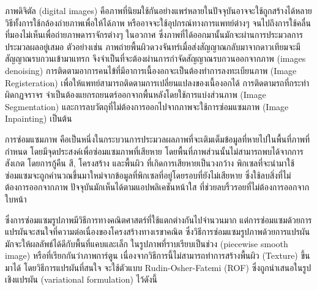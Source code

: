 \documentclass[hidelinks,a4paper,14pt]{article}
\numberwithin{equation}{section}							%
\begin{document}
{%
	
	
	
	
	
	ภาพดิจิตัล (digital images)  คือภาพที่นิยมใช้กันอย่างแพร่หลายในปัจจุบันอาจจะใช้ถูกสร้างได้หลายวิธีทั้งการใช้กล้องถ่ายภาพเพื่อให้ได้ภาพ หรืออาจจะใช้อุปกรณ์ทางการแพทย์ต่างๆ จนไปถึงการใช้คลื่นที่มองไม่เห็นเพื่อถ่ายภาพดาราจักรต่างๆ ในอวกาศ  ซึ่งภาพที่ได้ออกมานั้นมักจะผ่านการประมวลการประมวลผลอยู่เสมอ ตัวอย่างเช่น ภาพถ่ายพื้นผิวดวงจันทร์เมื่อส่งสัญญาณกลับมาจากดาวเทียมจะมีสัญญาณรบกวนเข้ามาแทรก จึงจำเป็นที่จะต้องผ่านการกำจัดสัญญาณรบกวนออกจากภาพ (images denoising) การติดตามอาการคนไข้ที่มีอาการเนื้องอกจะเป็นต้องทำการลงทะเบียนภาพ (Image Registeration) เพื่อให้แพทย์สามารถติดตามการเปลี่ยนแปลงของเนื้องอกได้ การติดตามรถที่กระทำผิดกฏจราจร จำเป็นต้องแยกรถยนตร์ออกจากพื้นหลังโดยใช้การแบ่งส่วนภาพ (Image Segmentation) และการลบวัตถุที่ไม่ต้องการออกไปจากภาพจะใช้การซ่อมแซมภาพ (Image Inpainting) เป็นต้น 
	
	
	การซ่อมแซมภาพ คือเป็นหนึ่งในกระบวนการประมวลผลภาพที่จะเติมเต็มข้อมูลที่หายไปในพื้นที่ภาพที่กำหนด โดยมีจุดประสงค์เพื่อซ่อมแซมภาพที่เสียหาย โดยพื้นที่ภาพส่วนนั้นไม่สามารถพบได้จากการสังเกต โดยการกู้คืน สี, โครงสร้าง และพื้นผิว ที่เกิดการเสียหายเป็นวงกว้าง พิกเซลที่จะนำมาใช้ซ่อมแซมจะถูกคำนวณขึ้นมาใหม่จากข้อมูลที่พิกเซลที่อยู่โดยรอบที่ยังไม่เสียหาย \cite{ref:defination-of-inpaint}  ซึ่งใช้ลบสิ่งที่ไม่ต้องการออกจากภาพ ปัจจุบันมักเห็นได้ตามแอปพลิเคชันหน้าใส ที่ช่วยลบริ้วรอยที่ไม่ต้องการออกจากใบหน้า
	
		
		ซึ่งการซ่อมแซมรูปภาพมีวิธีการทางคณิตศาสตร์ที่ใช้แตกต่างกันไปจำนวนมาก แต่การซ่อมแซมด้วยการแปรผันจะสนใจที่ความต่อเนื่องของโครงสร้างทางเรขาคณิต ซึ่งวิธีการซ่อมแซมรูปภาพด้วยการแปรผันมักจะให้ผลลัพธ์ได้ดีกับพื้นที่แคบและเล็ก ในรูปภาพที่ราบเรียบเป็นช่วง (piecewise smooth image) หรือที่เรียกกันว่าภาพการ์ตูน เนื่องจากวิธีการนี้ไม่สามารถทำการสร้างพื้นผิว (Texture) ขึ้นมาได้ \cite{ref:defination-of-variation-inpaint} โดยวิธีการแปรผันที่สนใจ จะใช้ตัวแบบ   Rudin-Osher-Fatemi (ROF) \cite{ref:ROF-template}ซึ่งถูกนำเสนอในรูปเชิงแปรผัน  (variational formulation) ไว้ดังนี้ 
		
}
\end{document}
